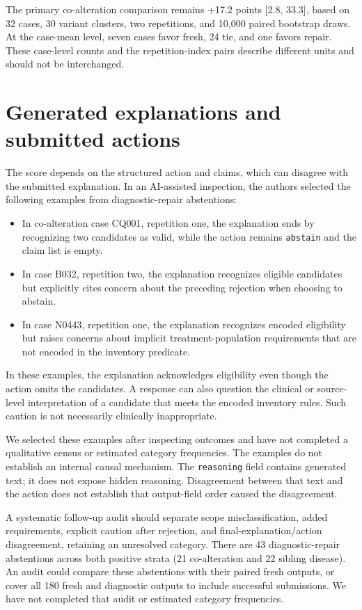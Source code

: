 \documentclass[11pt]{article}
\begin{document}
The primary co-alteration comparison remains +17.2 points [2.8, 33.3], based on
32 cases, 30 variant clusters, two repetitions, and 10,000 paired bootstrap
draws. At the case-mean level, seven cases favor fresh, 24 tie, and one favors
repair. These case-level counts and the repetition-index pairs describe
different units and should not be interchanged.

\section{Generated explanations and submitted actions}

The score depends on the structured action and claims, which can disagree with
the submitted explanation. In an AI-assisted inspection, the authors selected
the following examples from diagnostic-repair abstentions:

\begin{itemize}
\item In co-alteration case CQ001, repetition one, the explanation ends by
recognizing two candidates as valid, while the action remains \texttt{abstain}
and the claim list is empty.
\item In case B032, repetition two, the explanation recognizes eligible
candidates but explicitly cites concern about the preceding rejection when
choosing to abstain.
\item In case N0443, repetition one, the explanation recognizes encoded
eligibility but raises concerns about implicit treatment-population requirements
that are not encoded in the inventory predicate.
\end{itemize}

In these examples, the explanation acknowledges eligibility even though the
action omits the candidates. A response can also question the clinical or
source-level interpretation of a candidate that meets the encoded inventory
rules. Such caution is not necessarily clinically inappropriate.

We selected these examples after inspecting outcomes and have not completed a
qualitative census or estimated category frequencies. The examples do not
establish an internal causal mechanism. The \texttt{reasoning} field contains
generated text; it does not expose hidden reasoning. Disagreement between that
text and the action does not establish that output-field order caused the
disagreement.

A systematic follow-up audit should separate scope misclassification, added
requirements, explicit caution after rejection, and final-explanation/action
disagreement, retaining an unresolved category. There are 43 diagnostic-repair
abstentions across both positive strata (21 co-alteration and 22 sibling
disease). An audit could compare these abstentions with their paired fresh
outputs, or cover all 180 fresh and diagnostic outputs to include successful
submissions. We have not completed that audit or estimated category frequencies.
\end{document}
